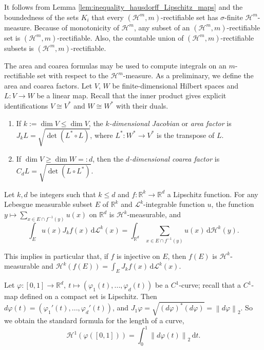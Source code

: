 \documentclass[runningheads]{llncs}
\newcommand{\norm}[1]{\left\|#1\right\|}
\def \d{\mbox{\(\,\mathrm{d}\)}}
\newcommand{\Rr}{\mathbb{R}}
\begin{document}
 It follows from Lemma \ref{lem:inequality_hausdorff_Lipschitz_maps} and the boundedness of the sets $K_i$ that
every $(\mathcal H^m,m)$-rectifiable set has $\sigma$-finite $\mathcal H^m$-measure. Because of monotonicity of $\mathcal H^m$,  any subset of an $(\mathcal H^m,m)$-rectifiable set is $(\mathcal H^m,m)$-rectifiable. Also, the countable union of $(\mathcal H^m,m)$-rectifiable subsets is $(\mathcal H^m,m)$-rectifiable.

The area and coarea formulas may be used to compute integrals on an $m$-rectifiable set with respect to the $\mathcal H^m$-measure. As a preliminary, we define the area and coarea factors.  Let $V$, $W$ be finite-dimensional Hilbert spaces and $L:V\to W$ be a linear map. Recall that the inner product gives explicit identifications $V\cong V^*$ and $W\cong W^*$ with their duals. 
\begin{enumerate}
    \item If $k:=\dim V \leq \dim V$, the \emph{$k$-dimensional Jacobian} or \emph{area factor} \cite[Def. 2.68]{Ambrosio2000} is $ J_k L = \sqrt{\det(L^* \circ L)}$,
    where $L^*:W^* \to V^*$ is the transpose of $L$.

    \item If $\dim V \geq \dim W=: d$, then the \emph{$d$-dimensional coarea factor} \cite[Def. 2.92]{Ambrosio2000} is $ C_d L =\sqrt{\det(L \circ L^*)}$.
\end{enumerate}
\begin{proposition}\label{Prop:area_formula}
Let $k,d$ be integers such that $k\leq d$ and $f:\Rr^k \to \Rr^d$ a Lipschitz function. For any Lebesgue measurable subset $E$ of $\Rr^k$ and $\mathcal L^k$-integrable function $u$, the function $y\mapsto \sum_{x\in E\cap f^{-1}(y)} u(x)$ on $\Rr^d$ is $\mathcal H^k$-measurable, and
\begin{equation}\label{eq:area_formula_functions}
\int_E u(x) J_kf(x) \d \mathcal L^k(x) = \int_{\Rr^d} \sum_{x\in E\cap f^{-1}(y)} u(x) \d \mathcal H^k(y).
\end{equation}
\end{proposition}

This implies in particular that, if $f$ is injective on $E$, then $f(E)$ is $\mathcal H^k$-measurable and $\mathcal H^k(f(E)) = \int_E  J_kf(x) \d \mathcal L^k(x)$. 

\begin{example}[Curves]\label{ex:curves}
Let $\varphi:[0,1]\to \Rr^d, \: t\mapsto (\varphi_1(t),...,\varphi_d(t))$ be a $C^1$-curve; recall that a $C^1$-map defined on a compact set is Lipschitz.  Then $d\varphi(t)= (\varphi_1'(t),...,\varphi_d'(t))$, and $J_1 \varphi = \sqrt{(d\varphi)^* (d\varphi)} = \norm{d\varphi}_2$. So we obtain the standard formula for the length of a curve, 
\begin{equation}
\mathcal H^1(\varphi([0,1])) = \int_0^1 \norm{d\varphi(t)}_2 \d t.
\end{equation}
\end{example}
\end{document}
